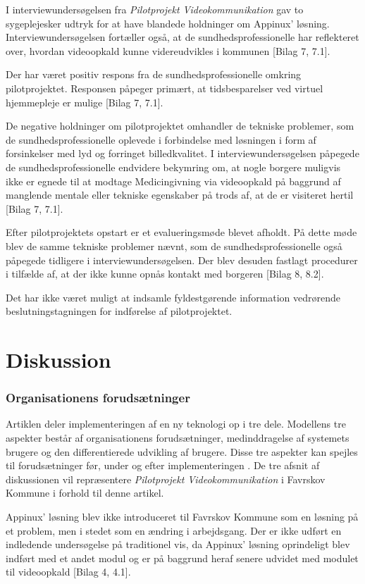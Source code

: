 I interviewundersøgelsen fra \textit{Pilotprojekt Videokommunikation} gav to sygeplejesker udtryk for at have blandede holdninger om Appinux' løsning. Interviewundersøgelsen fortæller også, at de sundhedsprofessionelle har reflekteret over, hvordan videoopkald kunne videreudvikles i kommunen [Bilag 7, 7.1]. 

Der har været positiv respons fra de sundhedsprofessionelle omkring pilotprojektet. Responsen påpeger primært, at tidsbesparelser ved virtuel hjemmepleje er mulige [Bilag 7, 7.1].

De negative holdninger om pilotprojektet omhandler de tekniske problemer, som de sundhedsprofessionelle oplevede i forbindelse med løsningen i form af forsinkelser med lyd og forringet billedkvalitet. I interviewundersøgelsen påpegede de sundhedsprofessionelle endvidere bekymring om, at nogle borgere muligvis ikke er egnede til at modtage Medicingivning via videoopkald på baggrund af manglende mentale eller tekniske egenskaber på trods af, at de er visiteret hertil [Bilag 7, 7.1].   

Efter pilotprojektets opstart er et evalueringsmøde blevet afholdt. På dette møde blev de samme tekniske problemer nævnt, som de sundhedsprofessionelle også påpegede tidligere i interviewundersøgelsen. Der blev desuden fastlagt procedurer i tilfælde af, at der ikke kunne opnås kontakt med borgeren [Bilag 8, 8.2]. 

Det har ikke været muligt at indsamle fyldestgørende information vedrørende beslutningstagningen for indførelse af pilotprojektet.

  
\section{Diskussion}
\subsubsection{Organisationens forudsætninger}
Artiklen  deler implementeringen af en ny teknologi op i tre dele. Modellens tre aspekter består af organisationens forudsætninger, medinddragelse af systemets brugere og den differentierede udvikling af brugere. Disse tre aspekter kan spejles til forudsætninger før, under og efter implementeringen \cite{Ikt}. De tre afsnit af diskussionen vil repræsentere \textit{Pilotprojekt Videokommunikation} i Favrskov Kommune i forhold til denne artikel. 

Appinux’ løsning blev ikke introduceret til Favrskov Kommune som en løsning på et problem, men i stedet som en ændring i arbejdsgang. Der er ikke udført en indledende undersøgelse på traditionel vis, da Appinux' løsning oprindeligt blev indført med et andet modul og er på baggrund heraf senere udvidet med modulet til videoopkald [Bilag 4, 4.1]. 


